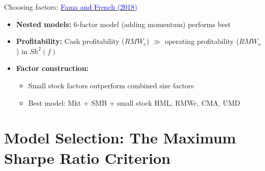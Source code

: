 \documentclass{beamer}
\begin{document}
\begin{frame}{Choosing factors: \href{https://doi.org/10.1016/j.jfineco.2018.02.012}{\textcolor{blue}{Fama and French (2018)}}}
\begin{itemize}
\item \textbf{Nested models:} 6-factor model (adding momentum) performs best
\item \textbf{Profitability:} Cash profitability ($RMW_c$) $\gg$ operating profitability ($RMW_o$) in $Sh^2 (f)$
\item \textbf{Factor construction:}
\begin{itemize}
\item Small stock factors outperform combined size factors
\item Best model: Mkt + SMB + small stock HML, RMWc, CMA, UMD
\end{itemize}
\end{itemize}
\end{frame}


\section{Model Selection: The Maximum Sharpe Ratio Criterion}
\end{document}
